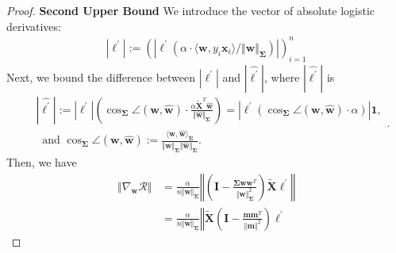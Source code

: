 \documentclass[pdflatex,sn-basic]{sn-jnl}%
\theoremstyle{thmstyleone}%
\begin{document}
\begin{appendices}
\begin{proof}
  \noindent\textbf{Second Upper Bound}
  We introduce the vector of absolute logistic derivatives:
  \begin{equation*}
  \begin{aligned}
    |\boldsymbol{\ell^\prime}|
    :=
    \left(
      \left|
        \ell^{\prime}\!\left(
          \alpha \cdot \langle \mathbf{w}, y_i \mathbf{x}_i \rangle / \Vert \mathbf{w} \Vert_{\mathbf{\Sigma}}
        \right)
      \right|
    \right)_{i=1}^{n}
  \end{aligned}
  \end{equation*}
  Next, we bound the difference between $|\boldsymbol{\ell^\prime}|$ and $|\hat{\boldsymbol{\ell^\prime}}|$, 
  where $|\hat{\boldsymbol{\ell^\prime}}|$ is 
  \begin{equation*}
  \begin{aligned}
    & |\hat{\boldsymbol{\ell^\prime}}| := 
    \left| \boldsymbol{\ell^\prime} \right| \left(
      \cos_{\mathbf{\Sigma}} \angle (\mathbf{w}, \hat{\mathbf{w}}) \cdot 
      \frac{\alpha \tilde{\mathbf{X}}^T \hat{\mathbf{w}}}{\Vert \hat{\mathbf{w}} \Vert_{\mathbf{\Sigma}}}
    \right)
    =
    \left|
      \ell^{\prime}
      \left(
        \cos_{\mathbf{\Sigma}} \angle (\mathbf{w}, \hat{\mathbf{w}}) \cdot \alpha
      \right)
    \right|
    \mathbf{1},
    \\ & 
    \ \text{ and }
    \cos_{\mathbf{\Sigma}} \angle (\mathbf{w}, \hat{\mathbf{w}}) := 
    \frac{
      \langle \mathbf{w}, \hat{\mathbf{w}} \rangle_{\mathbf{\Sigma}}
    }{
      \Vert \mathbf{w} \Vert_{\mathbf{\Sigma}} \Vert \hat{\mathbf{w}} \Vert_{\mathbf{\Sigma}}
    }.
  \end{aligned}.
  \end{equation*}
  Then, we have
  \begin{equation}\label{eq:gradient_norm_upper_decomposition}
  \begin{aligned}
    \left\Vert 
      \nabla_{\mathbf{w}} \mathcal{R}
    \right\Vert
    & =
    \frac{\alpha}{n \Vert \mathbf{w} \Vert_{\mathbf{\Sigma}}}
    \left\Vert
      \left(
        \mathbf{I} - \frac{\mathbf{\Sigma} \mathbf{w} \mathbf{w}^{T}}{\Vert \mathbf{w} \Vert_{\mathbf{\Sigma}}^{2}}
      \right)
      \tilde{\mathbf{X}} 
      \boldsymbol{\ell^\prime}
    \right\Vert
    \\ & =
    \frac{\alpha}{n \Vert \mathbf{w} \Vert_{\mathbf{\Sigma}}}
    \left\Vert
      \tilde{\mathbf{X}}
      \left(
        \mathbf{I} - \frac{\mathbf{m} \mathbf{m}^{T}}{\Vert \mathbf{m} \Vert^{2}}
      \right)
      \boldsymbol{\ell^\prime}

\end{aligned}
\end{equation}
\end{proof}
\end{appendices}
\end{document}
